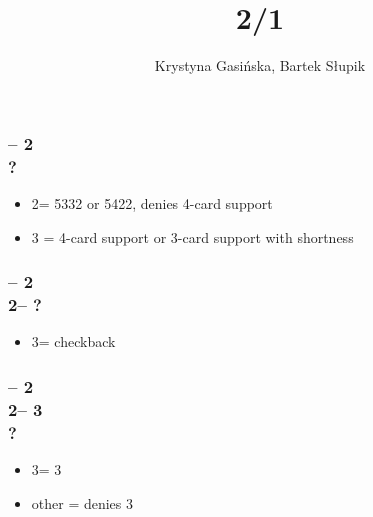 \documentclass[12pt, a4paper]{article}
\title{2/1 \gf}
\author{Krystyna Gasińska, Bartek Słupik}
\begin{document}
\maketitle


\subsubsection*{ -- 2 \\ ?}
\begin{itemize}
    \item 2\nt = 5332 or 5422, denies 4-card support
    \item 3 = 4-card support or 3-card support with shortness
\end{itemize}

\subsubsection*{ -- 2 
                \\ 2\nt -- ?}
\begin{itemize}
    \item 3\clubs = checkback
\end{itemize}

\subsubsection*{ -- 2 
                \\ 2\nt -- 3\clubs \\ ?}
\begin{itemize}
    \item 3\diams = 3 \imp
    \item other = denies 3
\end{itemize}

\end{document}
